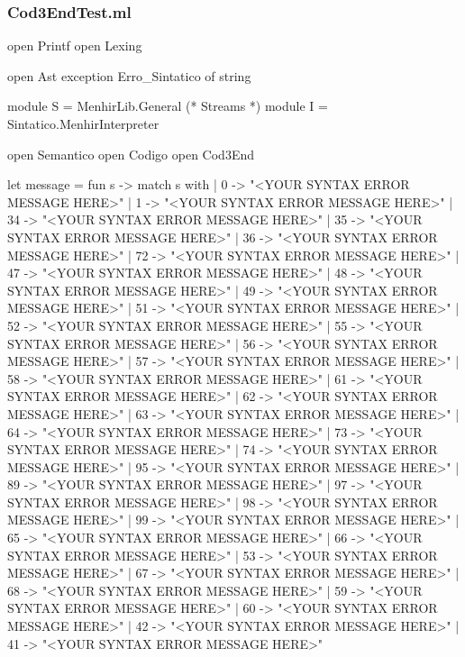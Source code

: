 \documentclass[12pt,a4paper,twoside]{article}
\begin{document}
\subsubsection{Cod3EndTest.ml}
\begin{terminal}
open Printf
open Lexing

open Ast
exception Erro_Sintatico of string

module S = MenhirLib.General (* Streams *)
module I = Sintatico.MenhirInterpreter

open Semantico
open Codigo
open Cod3End

let message =
  fun s ->
    match s with
    | 0 ->
        "<YOUR SYNTAX ERROR MESSAGE HERE>\n"
    | 1 ->
        "<YOUR SYNTAX ERROR MESSAGE HERE>\n"
    | 34 ->
        "<YOUR SYNTAX ERROR MESSAGE HERE>\n"
    | 35 ->
        "<YOUR SYNTAX ERROR MESSAGE HERE>\n"
    | 36 ->
        "<YOUR SYNTAX ERROR MESSAGE HERE>\n"
    | 72 ->
        "<YOUR SYNTAX ERROR MESSAGE HERE>\n"
    | 47 ->
        "<YOUR SYNTAX ERROR MESSAGE HERE>\n"
    | 48 ->
        "<YOUR SYNTAX ERROR MESSAGE HERE>\n"
    | 49 ->
        "<YOUR SYNTAX ERROR MESSAGE HERE>\n"
    | 51 ->
        "<YOUR SYNTAX ERROR MESSAGE HERE>\n"
    | 52 ->
        "<YOUR SYNTAX ERROR MESSAGE HERE>\n"
    | 55 ->
        "<YOUR SYNTAX ERROR MESSAGE HERE>\n"
    | 56 ->
        "<YOUR SYNTAX ERROR MESSAGE HERE>\n"
    | 57 ->
        "<YOUR SYNTAX ERROR MESSAGE HERE>\n"
    | 58 ->
        "<YOUR SYNTAX ERROR MESSAGE HERE>\n"
    | 61 ->
        "<YOUR SYNTAX ERROR MESSAGE HERE>\n"
    | 62 ->
        "<YOUR SYNTAX ERROR MESSAGE HERE>\n"
    | 63 ->
        "<YOUR SYNTAX ERROR MESSAGE HERE>\n"
    | 64 ->
        "<YOUR SYNTAX ERROR MESSAGE HERE>\n"
    | 73 ->
        "<YOUR SYNTAX ERROR MESSAGE HERE>\n"
    | 74 ->
        "<YOUR SYNTAX ERROR MESSAGE HERE>\n"
    | 95 ->
        "<YOUR SYNTAX ERROR MESSAGE HERE>\n"
    | 89 ->
        "<YOUR SYNTAX ERROR MESSAGE HERE>\n"
    | 97 ->
        "<YOUR SYNTAX ERROR MESSAGE HERE>\n"
    | 98 ->
        "<YOUR SYNTAX ERROR MESSAGE HERE>\n"
    | 99 ->
        "<YOUR SYNTAX ERROR MESSAGE HERE>\n"
    | 65 ->
        "<YOUR SYNTAX ERROR MESSAGE HERE>\n"
    | 66 ->
        "<YOUR SYNTAX ERROR MESSAGE HERE>\n"
    | 53 ->
        "<YOUR SYNTAX ERROR MESSAGE HERE>\n"
    | 67 ->
        "<YOUR SYNTAX ERROR MESSAGE HERE>\n"
    | 68 ->
        "<YOUR SYNTAX ERROR MESSAGE HERE>\n"
    | 59 ->
        "<YOUR SYNTAX ERROR MESSAGE HERE>\n"
    | 60 ->
        "<YOUR SYNTAX ERROR MESSAGE HERE>\n"
    | 42 ->
        "<YOUR SYNTAX ERROR MESSAGE HERE>\n"
    | 41 ->
        "<YOUR SYNTAX ERROR MESSAGE HERE>\n"

\end{terminal}
\end{document}
